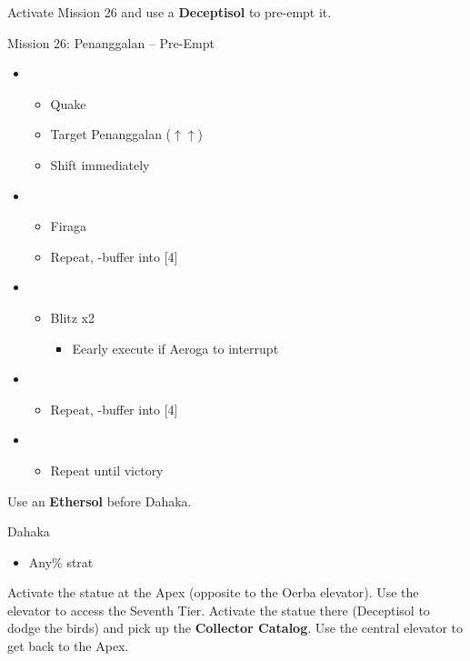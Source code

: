 Activate Mission 26 and use a \textbf{Deceptisol} to pre-empt it.
\vfill

\begin{battle}{Mission 26: Penanggalan -- Pre-Empt}
	\begin{itemize}
		\item \second
			\begin{itemize}
				\item Quake
				\item Target Penanggalan ($\uparrow\uparrow$)
				\item Shift immediately
			\end{itemize}
		\item \third
			\begin{itemize}
				\item Firaga
				\item Repeat, \com-buffer into [4]
			\end{itemize}
		\item \fourth
			\begin{itemize}
				\item Blitz x2
					\begin{itemize}
						\item Eearly execute if Aeroga to interrupt
					\end{itemize}
			\end{itemize}
		\item \third
			\begin{itemize}
				\item Repeat, \com-buffer into [4]
			\end{itemize}
		\item \fourth
			\begin{itemize}
				\item Repeat until victory
			\end{itemize}
	\end{itemize}
\end{battle}

Use an \textbf{Ethersol} before Dahaka.

\begin{battle}{Dahaka}
	\begin{itemize}
		\item Any\% strat
	\end{itemize}
\end{battle}

Activate the statue at the Apex (opposite to the Oerba elevator).
Use the elevator to access the Seventh Tier.
Activate the statue there (Deceptisol to dodge the birds) and pick up the \textbf{Collector Catalog}.
Use the central elevator to get back to the Apex.


